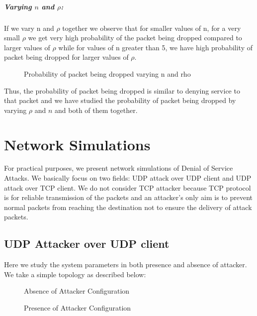 \subparagraph{Varying $n$ and $\rho$:} If we vary n and $\rho$ together we observe that for smaller values of n, for a very small $\rho$ we get very high probability of the packet being dropped compared to larger values of $\rho$ while for values of n greater than 5, we have high probability of packet being dropped for larger values of $\rho.$  

\begin{figure}[H]
		\centering
		\caption{{Probability of packet being dropped varying n and rho}}
		\label{fig:fige}
\end{figure}

Thus, the probability of packet being dropped is similar to denying service to that packet and we have studied the probability of packet being dropped by varying $\rho$ and $n$ and both of them together.

\pagebreak

\section{Network Simulations}

For practical purposes, we present network simulations of Denial of Service Attacks. We basically focus on two fields: UDP attack over UDP client and UDP attack over TCP client. We do not consider TCP attacker because TCP protocol is for reliable transmission of the packets and an attacker's only aim is to prevent normal packets from reaching the destination not to ensure the delivery of attack packets.

\subsection{UDP Attacker over UDP client}

Here we study the system parameters in both presence and absence of attacker. We take a simple topology as described below:

\begin{figure}[!htb]
		\centering
		\caption{{Absence of Attacker Configuration}}
		\label{fig:figf}
\end{figure}

\begin{figure}[!htb]
		\centering
		\caption{{Presence of Attacker Configuration}}
		\label{fig:figg}
\end{figure}

